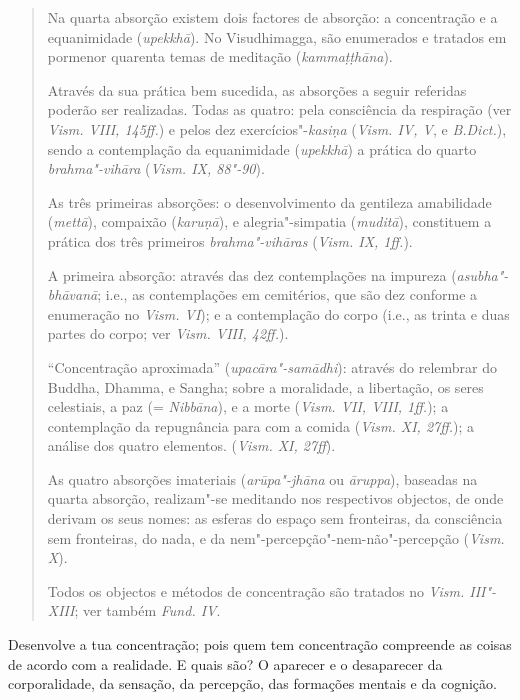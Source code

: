 \begin{quote}
  Na quarta absorção existem dois factores de absorção: a concentração e a
  equanimidade (\emph{upekkhā}). No Visudhimagga, são enumerados e tratados em
  pormenor quarenta temas de meditação (\emph{kamma\d{t}\d{t}hāna}).

  Através da sua prática bem sucedida, as absorções a seguir referidas poderão
  ser realizadas. Todas as quatro: pela consciência da respiração (ver
  \emph{Vism. VIII, 145ff.}) e pelos dez exercícios"-\emph{kasiṇa} (\emph{Vism. IV, V},
  e \emph{B.Dict.}), sendo a contemplação da equanimidade (\emph{upekkhā}) a
  prática do quarto \emph{brahma"-vihāra} (\emph{Vism. IX, 88"-90}).

  \clearpage

  As três primeiras absorções: o desenvolvimento da gentileza amabilidade
  (\emph{mettā}), compaixão (\emph{karu\d{n}ā}), e alegria"-simpatia
  (\emph{muditā}), constituem a prática dos três primeiros \emph{brahma"-vihāras}
  (\emph{Vism. IX, 1ff.}).

  A primeira absorção: através das dez contemplações na impureza
  (\emph{asubha"-bhāvanā}; i.e., as contemplações em cemitérios, que são dez
  conforme a enumeração no \emph{Vism. VI}); e a contemplação do corpo (i.e., as
  trinta e duas partes do corpo; ver \emph{Vism. VIII, 42ff.}).

  “Concentração aproximada” (\emph{upacāra"-samādhi}): através do relembrar do
  Buddha, Dhamma, e Sangha; sobre a moralidade, a libertação, os seres
  celestiais, a paz (= \emph{Nibbāna}), e a morte (\emph{Vism. VII, VIII,
    1ff.}); a contemplação da repugnância para com a comida (\emph{Vism. XI,
    27ff.}); a análise dos quatro elementos. (\emph{Vism. XI, 27ff}).

  As quatro absorções imateriais (\emph{arūpa"-jhāna} ou \emph{āruppa}), baseadas
  na quarta absorção, realizam"-se meditando nos respectivos objectos, de onde
  derivam os seus nomes: as esferas do espaço sem fronteiras, da consciência sem
  fronteiras, do nada, e da nem"-percepção"-nem-não"-percepção (\emph{Vism. X}).

  Todos os objectos e métodos de concentração são tratados no
  \emph{Vism. III"-XIII}; ver também \emph{Fund. IV}.
\end{quote}

Desenvolve a tua concentração; pois quem tem concentração compreende as coisas
de acordo com a realidade. E quais são? O aparecer e o desaparecer da
corporalidade, da sensação, da percepção, das formações mentais e da cognição.

